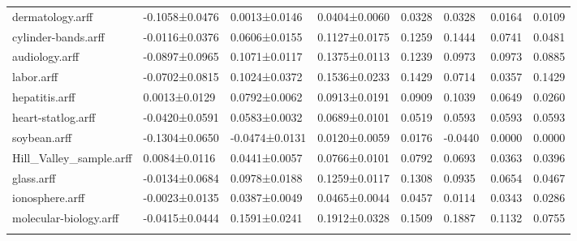 \begin{table*}[h]
\begin{tabular}{llllllll}
dermatology.arff&-0.1058±0.0476&0.0013±0.0146&0.0404±0.0060&0.0328&0.0328&0.0164&0.0109\\
cylinder-bands.arff&-0.0116±0.0376&0.0606±0.0155&0.1127±0.0175&0.1259&0.1444&0.0741&0.0481\\
audiology.arff&-0.0897±0.0965&0.1071±0.0117&0.1375±0.0113&0.1239&0.0973&0.0973&0.0885\\
labor.arff&-0.0702±0.0815&0.1024±0.0372&0.1536±0.0233&0.1429&0.0714&0.0357&0.1429\\
hepatitis.arff&0.0013±0.0129&0.0792±0.0062&0.0913±0.0191&0.0909&0.1039&0.0649&0.0260\\
heart-statlog.arff&-0.0420±0.0591&0.0583±0.0032&0.0689±0.0101&0.0519&0.0593&0.0593&0.0593\\
soybean.arff&-0.1304±0.0650&-0.0474±0.0131&0.0120±0.0059&0.0176&-0.0440&0.0000&0.0000\\
Hill_Valley_sample.arff&0.0084±0.0116&0.0441±0.0057&0.0766±0.0101&0.0792&0.0693&0.0363&0.0396\\
glass.arff&-0.0134±0.0684&0.0978±0.0188&0.1259±0.0117&0.1308&0.0935&0.0654&0.0467\\
ionosphere.arff&-0.0023±0.0135&0.0387±0.0049&0.0465±0.0044&0.0457&0.0114&0.0343&0.0286\\
molecular-biology.arff&-0.0415±0.0444&0.1591±0.0241&0.1912±0.0328&0.1509&0.1887&0.1132&0.0755\\
\noalign{\smallskip}\hline
\end{tabular}
\end{table*}